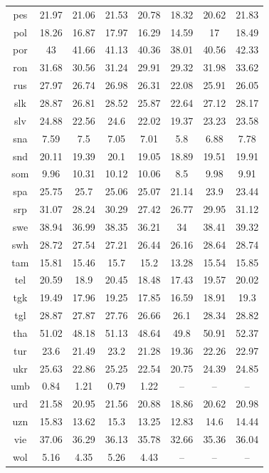 \begin{table}[htb]
\begin{tabular}{@{}cccccccc@{}}
pes & 21.97 & 21.06 & 21.53 & 20.78 & 18.32 & 20.62 & 21.83 \\
pol & 18.26 & 16.87 & 17.97 & 16.29 & 14.59 & 17 & 18.49 \\
por & 43 & 41.66 & 41.13 & 40.36 & 38.01 & 40.56 & 42.33 \\
ron & 31.68 & 30.56 & 31.24 & 29.91 & 29.32 & 31.98 & 33.62 \\
rus & 27.97 & 26.74 & 26.98 & 26.31 & 22.08 & 25.91 & 26.05 \\
slk & 28.87 & 26.81 & 28.52 & 25.87 & 22.64 & 27.12 & 28.17 \\
slv & 24.88 & 22.56 & 24.6 & 22.02 & 19.37 & 23.23 & 23.58 \\
sna & 7.59 & 7.5 & 7.05 & 7.01 & 5.8 & 6.88 & 7.78 \\
snd & 20.11 & 19.39 & 20.1 & 19.05 & 18.89 & 19.51 & 19.91 \\
som & 9.96 & 10.31 & 10.12 & 10.06 & 8.5 & 9.98 & 9.91 \\
spa & 25.75 & 25.7 & 25.06 & 25.07 & 21.14 & 23.9 & 23.44 \\
srp & 31.07 & 28.24 & 30.29 & 27.42 & 26.77 & 29.95 & 31.12 \\
swe & 38.94 & 36.99 & 38.35 & 36.21 & 34 & 38.41 & 39.32 \\
swh & 28.72 & 27.54 & 27.21 & 26.44 & 26.16 & 28.64 & 28.74 \\
tam & 15.81 & 15.46 & 15.7 & 15.2 & 13.28 & 15.54 & 15.85 \\
tel & 20.59 & 18.9 & 20.45 & 18.48 & 17.43 & 19.57 & 20.02 \\
tgk & 19.49 & 17.96 & 19.25 & 17.85 & 16.59 & 18.91 & 19.3 \\
tgl & 28.87 & 27.87 & 27.76 & 26.66 & 26.1 & 28.34 & 28.82 \\
tha & 51.02 & 48.18 & 51.13 & 48.64 & 49.8 & 50.91 & 52.37 \\
tur & 23.6 & 21.49 & 23.2 & 21.28 & 19.36 & 22.26 & 22.97 \\
ukr & 25.63 & 22.86 & 25.25 & 22.54 & 20.75 & 24.39 & 24.85 \\
umb & 0.84 & 1.21 & 0.79 & 1.22 & -- & -- & -- \\
urd & 21.58 & 20.95 & 21.56 & 20.88 & 18.86 & 20.62 & 20.98 \\
uzn & 15.83 & 13.62 & 15.3 & 13.25 & 12.83 & 14.6 & 14.44 \\
vie & 37.06 & 36.29 & 36.13 & 35.78 & 32.66 & 35.36 & 36.04 \\
wol & 5.16 & 4.35 & 5.26 & 4.43 & -- & -- & -- \\

\end{tabular}
\end{table}

